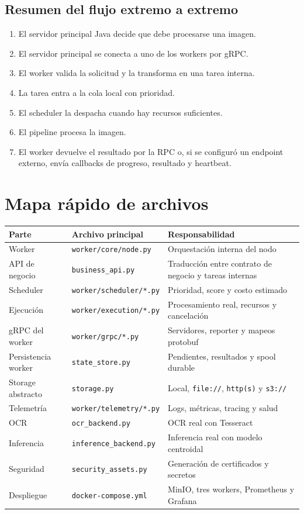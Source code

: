 \documentclass[11pt]{article}
\begin{document}
\subsection{Resumen del flujo extremo a extremo}
\begin{enumerate}
\item El servidor principal Java decide que debe procesarse una imagen.
\item El servidor principal se conecta a uno de los workers por gRPC.
\item El worker valida la solicitud y la transforma en una tarea interna.
\item La tarea entra a la cola local con prioridad.
\item El scheduler la despacha cuando hay recursos suficientes.
\item El pipeline procesa la imagen.
\item El worker devuelve el resultado por la RPC o, si se configuró un endpoint externo, envía callbacks de progreso, resultado y heartbeat.
\end{enumerate}

\section{Mapa rápido de archivos}
\begin{longtable}{>{\raggedright\arraybackslash}p{3.4cm} >{\raggedright\arraybackslash}p{4.2cm} >{\raggedright\arraybackslash}p{6.5cm}}
\toprule
\textbf{Parte} & \textbf{Archivo principal} & \textbf{Responsabilidad} \\
\midrule
Worker & \texttt{worker/core/node.py} & Orquestación interna del nodo \\
API de negocio & \texttt{business\_api.py} & Traducción entre contrato de negocio y tareas internas \\
Scheduler & \texttt{worker/scheduler/*.py} & Prioridad, score y costo estimado \\
Ejecución & \texttt{worker/execution/*.py} & Procesamiento real, recursos y cancelación \\
gRPC del worker & \texttt{worker/grpc/*.py} & Servidores, reporter y mapeos protobuf \\
Persistencia worker & \texttt{state\_store.py} & Pendientes, resultados y spool durable \\
Storage abstracto & \texttt{storage.py} & Local, \texttt{file://}, \texttt{http(s)} y \texttt{s3://} \\
Telemetría & \texttt{worker/telemetry/*.py} & Logs, métricas, tracing y salud \\
OCR & \texttt{ocr\_backend.py} & OCR real con Tesseract \\
Inferencia & \texttt{inference\_backend.py} & Inferencia real con modelo centroidal \\
Seguridad & \texttt{security\_assets.py} & Generación de certificados y secretos \\
Despliegue & \texttt{docker-compose.yml} & MinIO, tres workers, Prometheus y Grafana \\
\bottomrule
\end{longtable}
\end{document}
